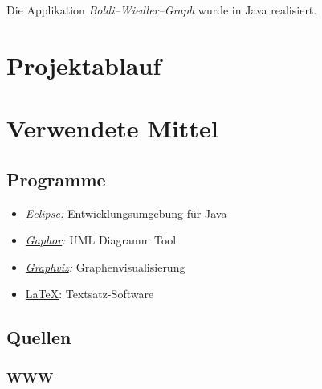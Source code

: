 \documentclass[a4paper,titlepage]{article}
\begin{document}
Die Applikation \emph{Boldi--Wiedler--Graph} wurde in Java realisiert.

\newpage

\section{Projektablauf}

\newpage

\section{Verwendete Mittel}

\subsection{Programme}

\begin{itemize}
\item \emph{\href{http://www.eclipse.org}{Eclipse}:} Entwicklungsumgebung für Java
\item \emph{\href{http://gaphor.sourceforge.net}{Gaphor}:} UML Diagramm Tool
\item \emph{\href{http://graphviz.org}{Graphviz}:} Graphenvisualisierung
\item \href{http://www.latex-project.org}{\LaTeX}: Textsatz-Software
\end{itemize}

\subsection{Quellen}

\subsubsection{WWW}
\end{document}
